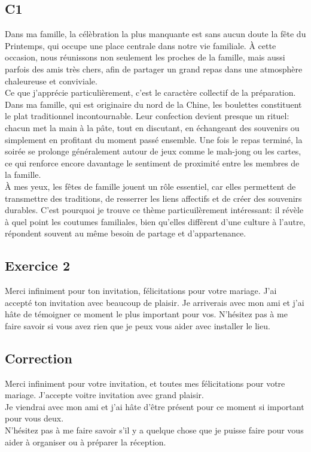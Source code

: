 \documentclass{book}
\begin{document}
        \subsection*{C1}
            Dans ma famille, la célèbration la plus manquante est sans aucun doute la fête du Printemps,
            qui occupe une place centrale dans notre vie familiale. 
            À cette occasion, nous réunissons non seulement les proches de la famille, mais aussi parfois des amis très chers,
            afin de partager un grand repas dans une atmosphère chaleureuse et conviviale.
            \\
            Ce que j'apprécie particulièrement, c'est le caractère collectif de la préparation.
            Dans ma famille, qui est originaire du nord de la Chine, les boulettes constituent le plat traditionnel incontournable. 
            Leur confection devient presque un rituel: chacun met la main à la pâte, tout en discutant, en échangeant des souvenirs ou simplement en profitant du moment passé ensemble.
            Une fois le repas terminé, la soirée se prolonge généralement autour de jeux comme le mah-jong ou les cartes,
            ce qui renforce encore davantage le sentiment de proximité entre les membres de la famille.
            \\
            À mes yeux, les fêtes de famille jouent un rôle essentiel, car elles permettent de transmettre des traditions,
            de resserrer les liens affectifs et de créer des souvenirs durables. C'est pourquoi je trouve ce thème particuilèrement intéressant: il révèle à quel point les coutumes familiales,
            bien qu'elles diffèrent d'une culture à l'autre,
            répondent souvent au même besoin de partage et d'appartenance.

        \newpage
        \subsection{Exercice 2}
            Merci infiniment pour ton invitation, félicitations pour votre mariage. 
            J'ai accepté ton invitation avec beaucoup de plaisir. 
            Je arriverais avec mon ami et j'ai hâte de témoigner ce moment le plus important pour vos.
            N'hésitez pas à me faire savoir si vous avez rien que je peux vous aider avec installer le lieu.

        \subsection*{Correction}
            Merci infiniment pour votre invitation, et toutes mes félicitations pour votre mariage.
            J'accepte voitre invitation avec grand plaisir. 
            \\
            Je viendrai avec mon ami et j'ai hâte d'être présent pour ce moment si important pour vous deux.
            \\
            N'hésitez pas à me faire savoir s'il y a quelque chose que je puisse faire pour vous aider à organiser ou à préparer la réception.
\end{document}
